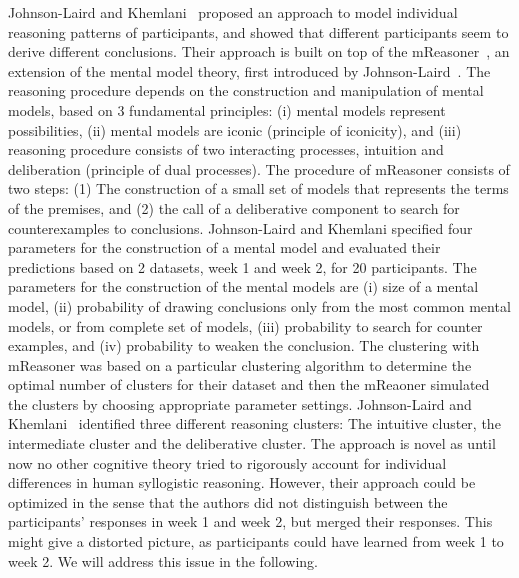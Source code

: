 \documentclass[12pt]{article}
\begin{document}
Johnson-Laird and Khemlani~\cite{khemlani:2016} proposed an approach to model individual reasoning patterns of participants, and 
showed that different participants seem to derive different conclusions.
Their approach is built on top of the mReasoner~\cite{khemlani:2013}, an extension of the mental model theory, first introduced by Johnson-Laird~\cite{johnsonlaird:1983}.
The reasoning procedure depends on the construction and manipulation of mental models, based on 3 fundamental principles: 
(i) mental models represent possibilities, (ii) mental models are iconic (principle of iconicity), and (iii) reasoning procedure consists of two interacting processes, intuition and deliberation (principle of dual processes).
 The procedure of mReasoner consists of two steps:
(1) The construction of a small set of models that represents the terms of the premises, and
(2) the call of a deliberative component to search for counterexamples to conclusions.
Johnson-Laird and Khemlani specified four parameters for the construction of a mental model and evaluated their
predictions based on 2 datasets, week 1 and week 2, for 20 participants.
The parameters for the construction of the mental models are (i) 
size of a mental model, (ii) probability of drawing conclusions only from the most common mental models, or from complete set of models,
(iii) probability to search for counter examples,
and (iv) probability to weaken the conclusion.
The clustering with mReasoner was based on a particular clustering algorithm to determine the optimal number of clusters for their dataset
and then
the mReaoner simulated the clusters by choosing appropriate parameter settings.
Johnson-Laird and Khemlani~\cite{khemlani:2016} identified three different reasoning clusters: The intuitive cluster, the intermediate cluster and the deliberative cluster.
The approach is novel as until now no other cognitive theory tried to rigorously account for individual differences in human syllogistic reasoning. However, their approach could be optimized in the sense that the authors did not distinguish between the participants' 
responses in week 1 and week 2, but merged their responses. This might give a distorted picture, as participants could have learned from week 1 to week 2.
We will address  this issue in the following.
\end{document}
